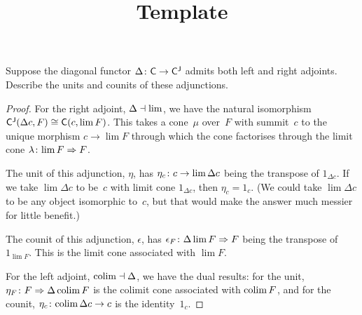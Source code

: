 \documentclass[../../solutions]{subfiles}
\title{Template}
\author{}
\begin{document}
\maketitle

%   

\begin{exercise}
  Suppose the diagonal functor ${\Delta}\colon{{\mathsf{C}}}\to{{\mathsf{C}}^{\mathsf{J}}}$ admits
  both left and right adjoints.  Describe the units and counits of
  these adjunctions.
\end{exercise}

\begin{proof}
  For the right adjoint, $\Delta\dashv\lim$, we have the natural
  isomorphism ${\mathsf{C}}^{\mathsf{J}}(\Delta c, F) \cong {\mathsf{C}}(c, \lim F)$.  This takes
  a cone~$\mu$ over~$F$ with summit~$c$ to the unique morphism
  $c\to\lim F$ through which the cone factorises through the limit
  cone ${\lambda}\colon{\lim F}\Rightarrow{F}$.

  The unit of this adjunction, $\eta$, has ${\eta_c}\colon{c}\to{\lim
    \Delta c}$ being the transpose of $1_{\Delta c}$.  If we take
  $\lim \Delta c$ to be~$c$ with limit cone $1_{\Delta c}$, then
  $\eta_c=1_c$.  (We could take $\lim \Delta c$ to be any object
  isomorphic to~$c$, but that would make the answer much messier for
  little benefit.)

  The counit of this adjunction, $\epsilon$, has
  ${\epsilon_F}\colon{\Delta \lim F}\Rightarrow{F}$ being the transpose of
  $1_{\lim F}$.  This is the limit cone associated with $\lim F$.

  For the left adjoint, $\operatorname{colim}\dashv\Delta$, we have the dual results:
  for the unit, ${\eta_F}\colon{F}\Rightarrow{\Delta\operatorname{colim}F}$ is the colimit cone
  associated with $\operatorname{colim} F$, and for the counit,
  ${\eta_c}\colon{\operatorname{colim}\Delta c}\to{c}$ is the identity~$1_c$.
\end{proof}
\end{document}
